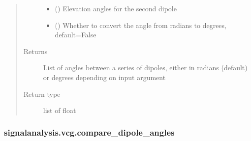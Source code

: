 \documentclass[letterpaper,10pt,english]{sphinxmanual}
\begin{document}
\begin{fulllineitems}
\begin{quote}
\begin{description}
\begin{itemize}
\item {} 
\sphinxAtStartPar
{} () \textendash{} Elevation angles for the second dipole

\item {} 
\sphinxAtStartPar
{} (\sphinxstyleliteralemphasis{\sphinxupquote{, }}) \textendash{} Whether to convert the angle from radians to degrees, default=False

\end{itemize}

\item[{Returns}] \leavevmode
\sphinxAtStartPar
{} \textendash{} List of angles between a series of dipoles, either in radians (default) or degrees depending on input argument

\item[{Return type}] \leavevmode
\sphinxAtStartPar
list of float

\end{description}\end{quote}

\end{fulllineitems}



\subsubsection{signalanalysis.vcg.compare\_dipole\_angles}
\label{\detokenize{_autosummary/signalanalysis.vcg.compare_dipole_angles:signalanalysis-vcg-compare-dipole-angles}}\label{\detokenize{_autosummary/signalanalysis.vcg.compare_dipole_angles::doc}}
\end{document}

